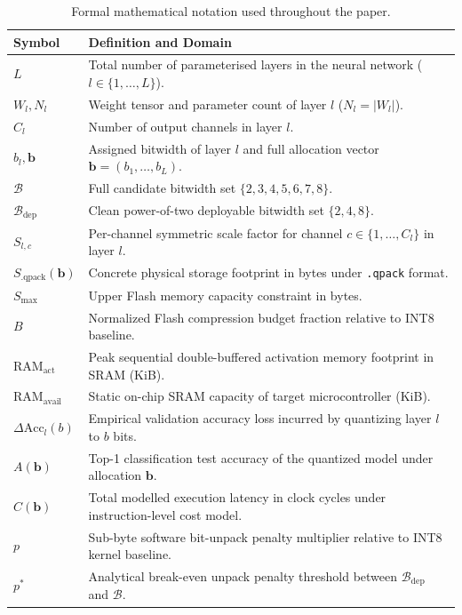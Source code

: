 \begin{table}[!t]
\centering
\caption{Formal mathematical notation used throughout the paper.}
\label{tab:notation}
\footnotesize
\begin{tabularx}{\columnwidth}{lX}
\toprule
\textbf{Symbol} & \textbf{Definition and Domain} \\
\midrule
$L$ & Total number of parameterised layers in the neural network ($l \in \{1, \dots, L\}$). \\
$W_l, N_l$ & Weight tensor and parameter count of layer $l$ ($N_l = |W_l|$). \\
$C_l$ & Number of output channels in layer $l$. \\
$b_l, \mathbf{b}$ & Assigned bitwidth of layer $l$ and full allocation vector $\mathbf{b} = (b_1, \dots, b_L)$. \\
$\mathcal{B}$ & Full candidate bitwidth set $\{2, 3, 4, 5, 6, 7, 8\}$. \\
$\mathcal{B}_{\text{dep}}$ & Clean power-of-two deployable bitwidth set $\{2, 4, 8\}$. \\
$S_{l, c}$ & Per-channel symmetric scale factor for channel $c \in \{1, \dots, C_l\}$ in layer $l$. \\
$S_{\text{.qpack}}(\mathbf{b})$ & Concrete physical storage footprint in bytes under \texttt{.qpack} format. \\
$S_{\text{max}}$ & Upper Flash memory capacity constraint in bytes. \\
$B$ & Normalized Flash compression budget fraction relative to INT8 baseline. \\
$\text{RAM}_{\text{act}}$ & Peak sequential double-buffered activation memory footprint in SRAM (KiB). \\
$\text{RAM}_{\text{avail}}$ & Static on-chip SRAM capacity of target microcontroller (KiB). \\
$\Delta \text{Acc}_l(b)$ & Empirical validation accuracy loss incurred by quantizing layer $l$ to $b$ bits. \\
$A(\mathbf{b})$ & Top-1 classification test accuracy of the quantized model under allocation $\mathbf{b}$. \\
$C(\mathbf{b})$ & Total modelled execution latency in clock cycles under instruction-level cost model. \\
$p$ & Sub-byte software bit-unpack penalty multiplier relative to INT8 kernel baseline. \\
$p^*$ & Analytical break-even unpack penalty threshold between $\mathcal{B}_{\text{dep}}$ and $\mathcal{B}$. \\
\bottomrule
\end{tabularx}
\end{table}
